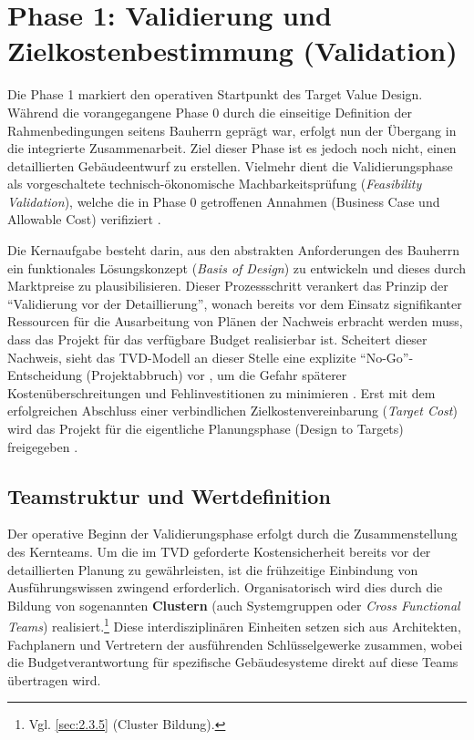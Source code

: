 \clearpage



\FloatBarrier
\clearpage
 
\section{Phase 1: Validierung und Zielkostenbestimmung (Validation)}
\label{sec:4.3}

Die Phase 1 markiert den operativen Startpunkt des Target Value Design. Während die vorangegangene Phase 0 durch die einseitige Definition der Rahmenbedingungen seitens Bauherrn geprägt war, erfolgt nun der Übergang in die integrierte Zusammenarbeit. Ziel dieser Phase ist es jedoch noch nicht, einen detaillierten Gebäudeentwurf zu erstellen. Vielmehr dient die Validierungsphase als vorgeschaltete technisch-ökonomische Machbarkeitsprüfung (\textit{Feasibility Validation}), welche die in Phase 0 getroffenen Annahmen (Business Case und Allowable Cost) verifiziert \autocite[Vgl.][S.~13]{ballard_target_2012}.

Die Kernaufgabe besteht darin, aus den abstrakten Anforderungen des Bauherrn ein funktionales Lösungskonzept (\textit{Basis of Design}) zu entwickeln und dieses durch Marktpreise zu plausibilisieren. Dieser Prozessschritt verankert das Prinzip der \enquote{Validierung vor der Detaillierung}, wonach bereits vor dem Einsatz signifikanter Ressourcen für die Ausarbeitung von Plänen der Nachweis erbracht werden muss, dass das Projekt für das verfügbare Budget realisierbar ist. Scheitert dieser Nachweis, sieht das \acs{TVD}-Modell an dieser Stelle eine explizite \enquote{No-Go}-Entscheidung (Projektabbruch) vor \autocite[Vgl.][S.~13]{ballard_target_2012}, um die Gefahr späterer Kostenüberschreitungen und Fehlinvestitionen zu minimieren \autocite[Vgl.][S.~171]{do_target_2014}. Erst mit dem erfolgreichen Abschluss einer verbindlichen Zielkostenvereinbarung (\textit{Target Cost}) wird das Projekt für die eigentliche Planungsphase (Design to Targets) freigegeben \autocite[Vgl.][S.~21]{ballard_target_2025}.

\subsection{Teamstruktur und Wertdefinition}
\label{sec:4.3.1}

Der operative Beginn der Validierungsphase erfolgt durch die Zusammenstellung des Kernteams. Um die im \ac{TVD} geforderte Kostensicherheit bereits vor der detaillierten Planung zu gewährleisten, ist die frühzeitige Einbindung von Ausführungswissen zwingend erforderlich. Organisatorisch wird dies durch die Bildung von sogenannten \textbf{Clustern} (auch Systemgruppen oder \textit{Cross Functional Teams}) realisiert.\footnote{Vgl. \cref{sec:2.3.5} (Cluster Bildung).} Diese interdisziplinären Einheiten setzen sich aus Architekten, Fachplanern und Vertretern der ausführenden Schlüsselgewerke zusammen, wobei die Budgetverantwortung für spezifische Gebäudesysteme direkt auf diese Teams übertragen wird. \autocite[Vgl.][S.~26]{ballard_target_2025}

